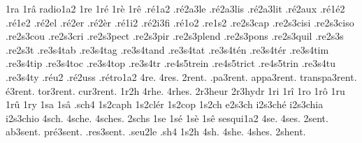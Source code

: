 {%
1ra
1r\^a
                    radio1a2 %
1re
1r\'e
1r\`e
1r\^e
                    .r\'e1a2
                    .r\'e2a3le
                    .r\'e2a3lis
                    .r\'e2a3lit
                    .r\'e2aux
                    .r\'e1\'e2
                    .r\'e1e2
                    .r\'e2el
                    .r\'e2er
                    .r\'e2\`er
                    .r\'e1i2
                    .r\'e2i3fi
                    .r\'e1o2
                    .re1s2
                    .re2s3cap
                    .re2s3cisi %
                    .re2s3ciso %
                    .re2s3cou
                    .re2s3cri
                    .re2s3pect
                    .re2s3pir
                    .re2s3plend
                    .re2s3pons
                    .re2s3quil
                    .re2s3s
                    .re2s3t
                    .re3s4tab
                    .re3s4tag
                    .re3s4tand
                    .re3s4tat
                    .re3s4t\'en
                    .re3s4t\'er
                    .re3s4tim
                    .re3s4tip
                    .re3s4toc
                    .re3s4top
                    .re3s4tr
                    .re4s5trein
                    .re4s5trict
                    .re4s5trin
                    .re3s4tu
                    .re3s4ty
                    .r\'eu2 %
                    .r\'e2uss
                    .r\'etro1a2
4re.
4res.
       2rent. %
    .pa3rent.
   appa3rent.
transpa3rent.
    \'e3rent.
    tor3rent.
    cur3rent.
%
1r2h
4rhe.
4rhes.
                    2r3heur
                    2r3hydr
1ri
1r\^i
1ro
1r\^o
1ru
1r\^u
1ry
1sa
1s\^a
.sch4
                    1s2caph
                    1s2cl\'er
                    1s2cop
 1s2ch
e2s3ch
i2s3ch\'e
i2s3chia
i2s3chio
4sch.
4sche.
4sches.
2schs
1se
1s\'e
1s\`e
1s\^e
                    sesqui1a2
4se.
4ses.
     2sent. %
   ab3sent.
pr\'e3sent.
 .res3sent.
%
.seu2le %
.sh4
1s2h
4sh.
4she.
4shes.
2shent. %
}
